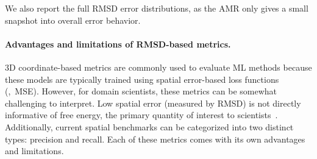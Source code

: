 We also report the full RMSD error distributions, as the AMR only gives a small snapshot into overall error behavior.


\vspace{-1ex}
\paragraph{Advantages and limitations of RMSD-based metrics.}
3D coordinate-based metrics are commonly used to evaluate ML methods because these models are typically trained using spatial error-based loss functions (\ie,\ MSE). However, for domain scientists, these metrics can be somewhat challenging to interpret. Low spatial error (measured by RMSD) is not directly informative of free energy, the primary quantity of interest to scientists~\citep{blau, blau2}.
Additionally, current spatial benchmarks can be categorized into two distinct types: precision and recall. Each of these metrics comes with its own advantages and limitations.

